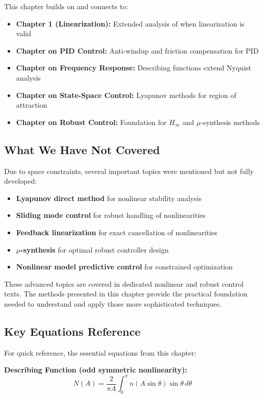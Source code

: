 This chapter builds on and connects to:
\begin{itemize}
    \item \textbf{Chapter 1 (Linearization):} Extended analysis of when linearization is valid
    \item \textbf{Chapter on PID Control:} Anti-windup and friction compensation for PID
    \item \textbf{Chapter on Frequency Response:} Describing functions extend Nyquist analysis
    \item \textbf{Chapter on State-Space Control:} Lyapunov methods for region of attraction
    \item \textbf{Chapter on Robust Control:} Foundation for $H_\infty$ and $\mu$-synthesis methods
\end{itemize}

\subsection{What We Have Not Covered}

Due to space constraints, several important topics were mentioned but not fully developed:
\begin{itemize}
    \item \textbf{Lyapunov direct method} for nonlinear stability analysis
    \item \textbf{Sliding mode control} for robust handling of nonlinearities
    \item \textbf{Feedback linearization} for exact cancellation of nonlinearities
    \item \textbf{$\mu$-synthesis} for optimal robust controller design
    \item \textbf{Nonlinear model predictive control} for constrained optimization
\end{itemize}

These advanced topics are covered in dedicated nonlinear and robust control texts. The methods presented in this chapter provide the practical foundation needed to understand and apply those more sophisticated techniques.

\subsection{Key Equations Reference}

For quick reference, the essential equations from this chapter:

\textbf{Describing Function (odd symmetric nonlinearity):}
\begin{equation}
N(A) = \frac{2}{\pi A}\int_0^{\pi} n(A\sin\theta)\sin\theta \, d\theta
\end{equation}

